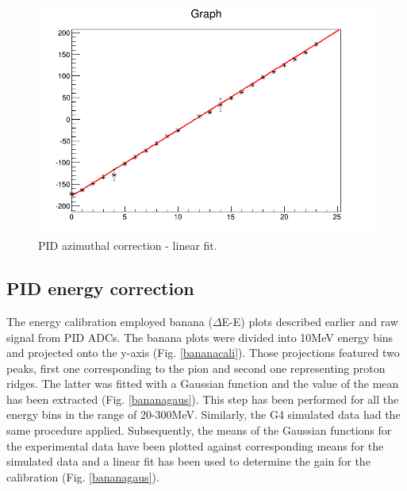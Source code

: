\begin{figure}[H]
\begin{center}
\includegraphics[scale=0.4]{pidcali4.png}
\caption{PID azimuthal correction - linear fit.}
\label{pidphi2}
\end{center}
\end{figure}

\subsection{PID energy correction}

\indent The energy calibration employed banana ($\Delta$E-E) plots described earlier and raw signal from PID ADCs. The banana plots were divided into 10MeV energy bins and projected onto the y-axis (Fig. \ref{bananacali}). Those projections featured two peaks, first one corresponding to the pion and second one representing proton ridges. The latter was fitted with a Gaussian function and the value of the mean has been extracted (Fig. \ref{bananagaus}). This step has been performed for all the energy bins in the range of 20-300MeV. Similarly, the G4 simulated data had the same procedure applied. Subsequently, the means of the Gaussian functions for the experimental data have been plotted against corresponding means for the simulated data and a linear fit has been used to determine the gain for the calibration (Fig. \ref{bananagaus}).

